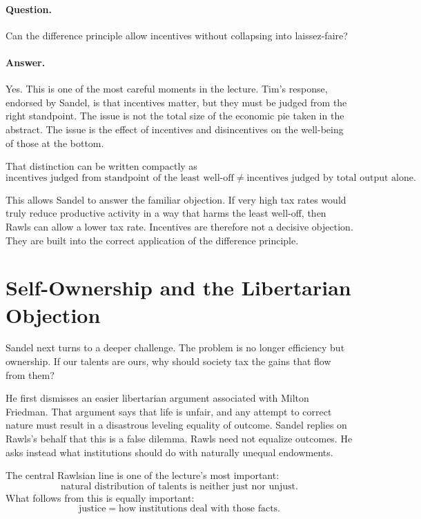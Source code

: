 \paragraph{Question.} Can the difference principle allow incentives without collapsing into laissez-faire?

\paragraph{Answer.} Yes. This is one of the most careful moments in the lecture. Tim's response, endorsed by Sandel, is that incentives matter, but they must be judged from the right standpoint. The issue is not the total size of the economic pie taken in the abstract. The issue is the effect of incentives and disincentives on the well-being of those at the bottom.

That distinction can be written compactly as
\begin{equation}
\text{incentives judged from standpoint of the least well-off}
\neq
\text{incentives judged by total output alone}.
\end{equation}

This allows Sandel to answer the familiar objection. If very high tax rates would truly reduce productive activity in a way that harms the least well-off, then Rawls can allow a lower tax rate. Incentives are therefore not a decisive objection. They are built into the correct application of the difference principle.

\section{Self-Ownership and the Libertarian Objection}

Sandel next turns to a deeper challenge. The problem is no longer efficiency but ownership. If our talents are ours, why should society tax the gains that flow from them?

He first dismisses an easier libertarian argument associated with Milton Friedman. That argument says that life is unfair, and any attempt to correct nature must result in a disastrous leveling equality of outcome. Sandel replies on Rawls's behalf that this is a false dilemma. Rawls need not equalize outcomes. He asks instead what institutions should do with naturally unequal endowments.

The central Rawlsian line is one of the lecture's most important:
\begin{equation}
\text{natural distribution of talents is neither just nor unjust}.
\end{equation}
What follows from this is equally important:
\begin{equation}
\text{justice}=\text{how institutions deal with those facts}.
\end{equation}

